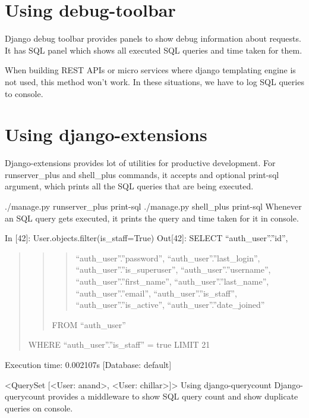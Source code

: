 \documentclass[letterpaper,11pt,english]{sphinxmanual}
\begin{document}
\section{Using debug-toolbar}
\label{\detokenize{orm_log_sql:using-debug-toolbar}}
Django debug toolbar provides panels to show debug information about requests. It has SQL panel which shows all executed SQL queries and time taken for them.

When building REST APIs or micro services where django templating engine is not used, this method won’t work. In these situations, we have to log SQL queries to console.


\section{Using django-extensions}
\label{\detokenize{orm_log_sql:using-django-extensions}}
Django-extensions provides lot of utilities for productive development. For runserver\_plus and shell\_plus commands, it accepts and optional \textendash{}print-sql argument, which prints all the SQL queries that are being executed.

./manage.py runserver\_plus \textendash{}print-sql
./manage.py shell\_plus \textendash{}print-sql
Whenever an SQL query gets executed, it prints the query and time taken for it in console.

In {[}42{]}: User.objects.filter(is\_staff=True)
Out{[}42{]}: SELECT “auth\_user”.”id”,
\begin{quote}
\begin{quote}
\begin{quote}

“auth\_user”.”password”,
“auth\_user”.”last\_login”,
“auth\_user”.”is\_superuser”,
“auth\_user”.”username”,
“auth\_user”.”first\_name”,
“auth\_user”.”last\_name”,
“auth\_user”.”email”,
“auth\_user”.”is\_staff”,
“auth\_user”.”is\_active”,
“auth\_user”.”date\_joined”
\end{quote}

FROM “auth\_user”
\end{quote}

WHERE “auth\_user”.”is\_staff” = true
LIMIT 21
\end{quote}

Execution time: 0.002107s {[}Database: default{]}

\textless{}QuerySet {[}\textless{}User: anand\textgreater{}, \textless{}User: chillar\textgreater{}{]}\textgreater{}
Using django-querycount
Django-querycount provides a middleware to show SQL query count and show duplicate queries on console.
\end{document}
